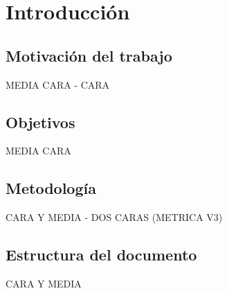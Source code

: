 \newpage %
\thispagestyle{empty}
\mbox{}

\chapter{Introducción} 
\label{ch:introduccion}
\section{Motivación del trabajo}
MEDIA CARA - CARA

\section{Objetivos}
MEDIA CARA

\section{Metodología}
CARA Y MEDIA - DOS CARAS (METRICA V3)

\section{Estructura del documento}
CARA Y MEDIA